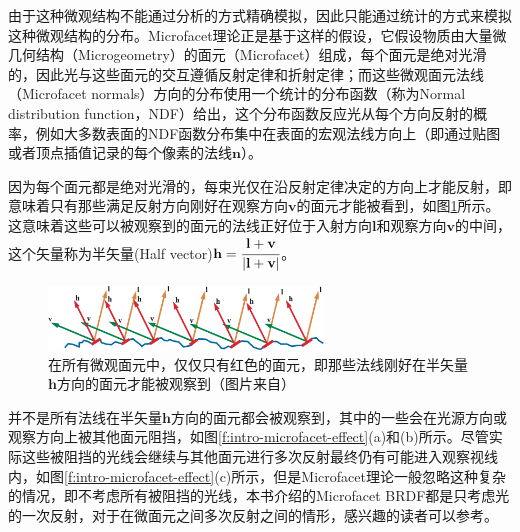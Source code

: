 由于这种微观结构不能通过分析的方式精确模拟，因此只能通过统计的方式来模拟这种微观结构的分布。Microfacet理论正是基于这样的假设，它假设物质由大量微几何结构（Microgeometry）的面元（Microfacet）组成，每个面元是绝对光滑的，因此光与这些面元的交互遵循反射定律和折射定律；而这些微观面元法线（Microfacet normals）方向的分布使用一个统计的分布函数（称为Normal distribution function，NDF）给出，这个分布函数反应光从每个方向反射的概率，例如大多数表面的NDF函数分布集中在表面的宏观法线方向上（即通过贴图或者顶点插值记录的每个像素的法线$\mathbf{n}$）。

因为每个面元都是绝对光滑的，每束光仅在沿反射定律决定的方向上才能反射，即意味着只有那些满足反射方向刚好在观察方向$\mathbf{v}$的面元才能被看到，如图\ref{f:intro-microfacet}所示。这意味着这些可以被观察到的面元的法线正好位于入射方向$\mathbf{l}$和观察方向$\mathbf{v}$的中间，这个矢量称为半矢量(Half vector)$\mathbf{h}= \cfrac{\mathbf{l}+\mathbf{v}}{|\mathbf{l}+\mathbf{v}|}$。

\begin{figure}
\sidecaption
	\includegraphics[width=0.65\textwidth]{graphics/gi/ray-optics-9}
	\caption{在所有微观面元中，仅仅只有红色的面元，即那些法线刚好在半矢量$\mathbf{h}$方向的面元才能被观察到（图片来自\cite{b:rtr}）}
	\label{f:intro-microfacet}
\end{figure}

并不是所有法线在半矢量$\mathbf{h}$方向的面元都会被观察到，其中的一些会在光源方向或观察方向上被其他面元阻挡，如图\ref{f:intro-microfacet-effect}(a)和(b)所示。尽管实际这些被阻挡的光线会继续与其他面元进行多次反射最终仍有可能进入观察视线内，如图\ref{f:intro-microfacet-effect}(c)所示，但是Microfacet理论一般忽略这种复杂的情况，即不考虑所有被阻挡的光线，本书介绍的Microfacet BRDF都是只考虑光的一次反射，对于在微面元之间多次反射之间的情形，感兴趣的读者可以参考\cite{a:MultidimensionalBinarySearchTreesUsedforAssociativeSearching}。

